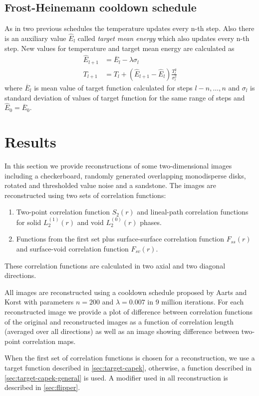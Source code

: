 \documentclass[preprint,amsmath,amssymb,aps,pre]{revtex4-1}
\begin{document}
\subsection{Frost-Heinemann cooldown schedule}
\label{sec:cooldown-frost-heinemann}
As in two previous schedules the temperature updates every n-th step. Also there
is an auxiliary value $\hat{E}_l$ called \textit{target mean energy} which also
updates every n-th step. New values for temperature and target mean energy are
calculated as
\begin{align*}
  \hat{E}_{l+1} & = \overline{E}_l - \lambda \sigma_l \\
  T_{l+1} & = T_l + (\hat{E}_{l+1} - \hat{E}_l)\frac{T^2_l}{\sigma^2_l}
\end{align*}
where $\overline{E}_l$ is mean value of target function calculated for
steps $l-n,\dots,n$ and $\sigma_l$ is standard deviation of values of
target function for the same range of steps and $\hat{E}_0 = \overline{E}_0$.

\section{Results}
In this section we provide reconstructions of some two-dimensional images
including a checkerboard, randomly generated overlapping monodisperse disks,
rotated and thresholded value noise and a sandstone. The images are
reconstructed using two sets of correlation functions:
\begin{enumerate}
\item Two-point correlation function $S_2(r)$ and lineal-path correlation
  functions for solid $L_2^{(1)}(r)$ and void $L_2^{(0)}(r)$ phases.
\item Functions from the first set plus surface-surface correlation function
  $F_{ss}(r)$ and surface-void correlation function $F_{sv}(r)$.
\end{enumerate}
These correlation functions are calculated in two axial and two diagonal
directions.

All images are reconstructed using a cooldown schedule proposed by Aarts and
Korst \cite{Aarts-Korst} with parameters $n = 200$ and $\lambda = 0.007$ in 9
million iterations. For each reconstructed image we provide a plot of difference
between correlation functions of the original and reconstructed images as a
function of correlation length (averaged over all directions) as well as an
image showing difference between two-point correlation maps.

When the first set of correlation functions is chosen for a reconstruction, we
use a target function described in \cref{sec:target-capek}, otherwise, a
function described in \cref{sec:target-capek-general} is used. A modifier used
in all reconstruction is described in \cref{sec:flipper}.
\end{document}
